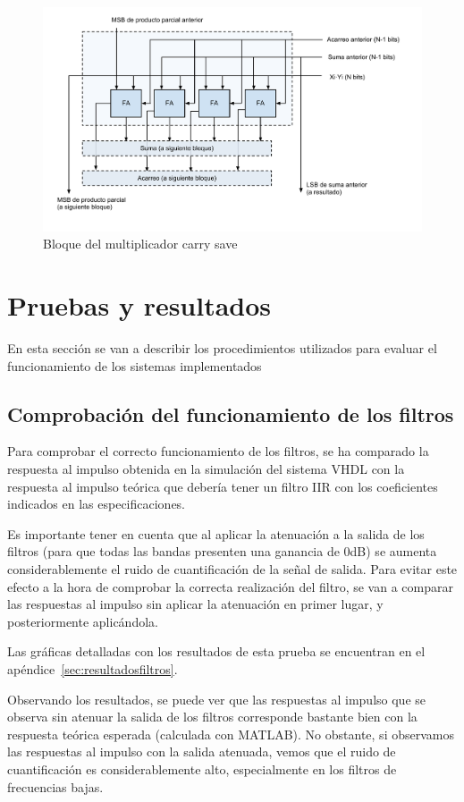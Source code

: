 \documentclass[a4paper,12pt]{article}
\begin{document}
\begin{figure}[hbt]
\includegraphics[width=\textwidth]{img/carry_save_block.pdf} 
\caption{Bloque del multiplicador carry save} \label{fig:carry_save_block}
\end{figure}

\clearpage
\section{Pruebas y resultados}
En esta sección se van a describir los procedimientos utilizados para evaluar el funcionamiento de los sistemas implementados
\subsection{Comprobación del funcionamiento de los filtros}\label{sec:pruebafiltros}
Para comprobar el correcto funcionamiento de los filtros, se ha comparado la respuesta al impulso obtenida en la simulación del sistema VHDL con la respuesta al impulso teórica que debería tener un filtro IIR con los coeficientes indicados en las especificaciones.

Es importante tener en cuenta que al aplicar la atenuación a la salida de los filtros (para que todas las bandas presenten una ganancia de 0dB) se aumenta considerablemente el ruido de cuantificación de la señal de salida. Para evitar este efecto a la hora de comprobar la correcta realización del filtro, se van a comparar las respuestas al impulso sin aplicar la atenuación en primer lugar, y posteriormente aplicándola.

Las gráficas detalladas con los resultados de esta prueba se encuentran en el apéndice~\ref{sec:resultadosfiltros}.

Observando los resultados, se puede ver que las respuestas al impulso que se observa sin atenuar la salida de los filtros corresponde bastante bien con la respuesta teórica esperada (calculada con MATLAB). No obstante, si observamos las respuestas al impulso con la salida atenuada, vemos que el ruido de cuantificación es considerablemente alto, especialmente en los filtros de frecuencias bajas.
\end{document}
